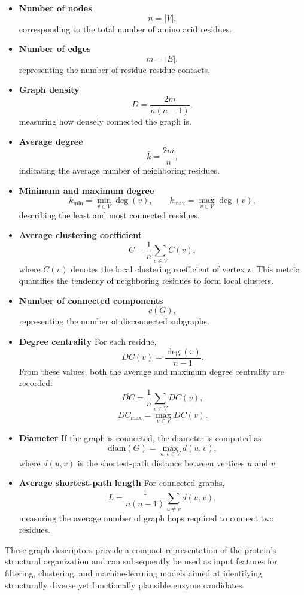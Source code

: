 \documentclass[runningheads]{llncs}
\begin{document}
\begin{itemize}
	\item \textbf{Number of nodes}
	\[
	n = |V|,
	\]
	corresponding to the total number of amino acid residues.
	
	\item \textbf{Number of edges}
	\[
	m = |E|,
	\]
	representing the number of residue-residue contacts.
	
	\item \textbf{Graph density}
	\[
	D = \frac{2m}{n(n-1)},
	\]
	measuring how densely connected the graph is.
	
	\item \textbf{Average degree}
	\[
	\bar{k} = \frac{2m}{n},
	\]
	indicating the average number of neighboring residues.
	
	\item \textbf{Minimum and maximum degree}
	\[
	k_{\min} = \min_{v \in V} \deg(v),
	\qquad
	k_{\max} = \max_{v \in V} \deg(v),
	\]
	describing the least and most connected residues.
	
	\item \textbf{Average clustering coefficient}
	\[
	C = \frac{1}{n}\sum_{v\in V} C(v),
	\]
	where $C(v)$ denotes the local clustering coefficient of vertex $v$. This metric quantifies the tendency of neighboring residues to form local clusters.
	
	\item \textbf{Number of connected components}
	\[
	c(G),
	\]
	representing the number of disconnected subgraphs.
	
	\item \textbf{Degree centrality}
	For each residue,
	\[
	DC(v)=\frac{\deg(v)}{n-1}.
	\]
	From these values, both the average and maximum degree centrality are recorded:
	\[
	\overline{DC}
	=
	\frac{1}{n}
	\sum_{v\in V}DC(v),
	\]
	\[
	DC_{\max}
	=
	\max_{v\in V}DC(v).
	\]
	
	\item \textbf{Diameter}
	If the graph is connected, the diameter is computed as
	\[
	\mathrm{diam}(G)
	=
	\max_{u,v\in V} d(u,v),
	\]
	where $d(u,v)$ is the shortest-path distance between vertices $u$ and $v$.
	
	\item \textbf{Average shortest-path length}
	For connected graphs,
	\[
	L
	=
	\frac{1}{n(n-1)}
	\sum_{u\neq v} d(u,v),
	\]
	measuring the average number of graph hops required to connect two residues.
\end{itemize}

These graph descriptors provide a compact representation of the protein's structural organization and can subsequently be used as input features for filtering, clustering, and machine-learning models aimed at identifying structurally diverse yet functionally plausible enzyme candidates.
\end{document}
